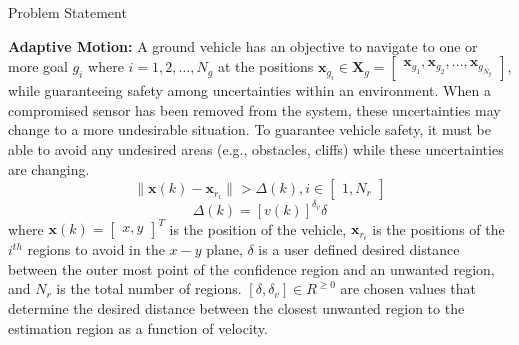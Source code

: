 \begin{section}{Problem Statement}
\begin{problem} \label{problem2} {\textbf{Adaptive Motion:}} 
A ground vehicle has an objective to navigate to one or more goal $g_i$ where $i=1,2,\dots,N_g$ at the positions $\bm{x}_{g_i} \in \bm{X}_g =  \begin{bmatrix} \bm{x}_{g_1},\bm{x}_{g_2},\dots,\bm{x}_{g_{N_g}} \end{bmatrix}$, while guaranteeing safety among uncertainties within an environment. When a compromised sensor has been removed from the system, these uncertainties may change to a more undesirable situation. To guarantee vehicle safety, it must be able to avoid any undesired areas (e.g., obstacles, cliffs) while these uncertainties are changing.
	\begin{equation}
		\lVert {\bm{x}(k)-\bm{x}_{r_i}} \rVert >\Delta(k),  i \in \begin{bmatrix} 1,N_r \end{bmatrix}
	\end{equation}
	\begin{equation}
		\Delta(k)=[v(k)]^{\delta_v}\delta
	\end{equation}
where $\bm{x}(k)={\begin{bmatrix} x,y \end{bmatrix}}^T$ is the position of the vehicle, $\bm{x}_{r_i}$ is the positions of the ${i}^{th}$ regions to avoid in the $x-y$ plane, $\delta$ is a user defined desired distance between the outer most point of the confidence region and an unwanted region, and $N_r$ is the total number of regions. $[\delta, \delta_v] \in R^{\geq0}$ are chosen values that determine the desired distance between the closest unwanted region to the estimation region as a function of velocity.





\end{problem}
\end{section}
